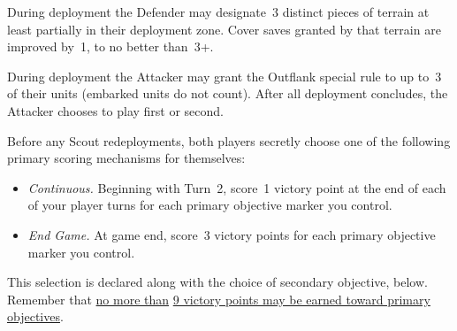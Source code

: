 
 During deployment the Defender may
designate~3 distinct pieces of terrain at least partially in their
deployment zone.  Cover saves granted by that terrain are improved
by~1, to no better than~3+.

 During deployment the Attacker may
grant the Outflank special rule to up to~3 of their units (embarked
units do not count). After all deployment concludes, the Attacker
chooses to play first or second.




\begin{scoring}
  
\begin{primaries}

  Before any Scout redeployments, both players secretly choose one of
  the following primary scoring mechanisms for themselves:

  \begin{itemize}
  \item {\textit{Continuous.}} Beginning with Turn~2, score~1 victory
    point at the end of each of your player turns for each primary
    objective marker you control.

  \item {\textit{End Game.}} At game end, score~3 victory points for
    each primary objective marker you control.

  \end{itemize}
  This selection is declared along with the choice of secondary
  objective, below.  Remember that \underline{no more than}
  \underline{9 victory points may be earned toward primary
    objectives}.

\end{primaries}

\end{scoring}
